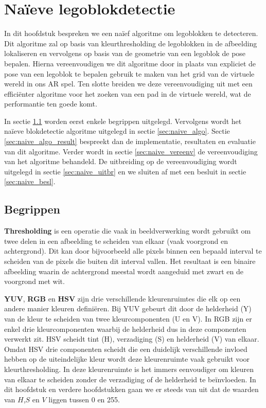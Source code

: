\chapter{Na\"ieve legoblokdetectie}
\label{hoofdstuk:2}
In dit hoofdstuk bespreken we een na\"ief algoritme om legoblokken te detecteren. Dit algoritme zal op basis van kleurthresholding de legoblokken in de afbeelding lokaliseren en vervolgens op basis van de geometrie van een legoblok de pose bepalen. Hierna vereenvoudigen we dit algoritme door in plaats van expliciet de pose van een legoblok te bepalen gebruik te maken van het grid van de virtuele wereld in ons AR spel. Ten slotte breiden we deze vereenvoudiging uit met een effici\"enter algoritme voor het zoeken van een pad in de virtuele wereld, wat de performantie ten goede komt.

In sectie \ref{sec:naive_begr} worden eerst enkele begrippen uitgelegd. Vervolgens wordt het na\"ieve blokdetectie algoritme uitgelegd in sectie \ref{sec:naive_algo}. Sectie \ref{sec:naive_algo_result} bespreekt dan de implementatie, resultaten en evaluatie van dit algoritme. Verder wordt in sectie \ref{sec:naive_vereenv} de vereenvoudiging van het algoritme behandeld. De uitbreiding op de vereenvoudiging wordt uitgelegd in sectie \ref{sec:naive_uitbr} en we sluiten af met een besluit in sectie \ref{sec:naive_besl}.

\section{Begrippen} \label{sec:naive_begr}

\textbf{Thresholding} is een operatie die vaak in beeldverwerking wordt gebruikt om twee delen in een afbeelding te scheiden van elkaar (vaak voorgrond en achtergrond). Dit kan door bijvoorbeeld alle pixels binnen een bepaald interval te scheiden van de pixels die buiten dit interval vallen. Het resultaat is een binaire afbeelding waarin de achtergrond meestal wordt aangeduid met zwart en de voorgrond met wit.

\textbf{YUV}, \textbf{RGB} en \textbf{HSV} zijn drie verschillende kleurenruimtes die elk op een andere manier kleuren defini\"eren. Bij YUV gebeurt dit door de helderheid (Y) van de kleur te scheiden van twee kleurcomponenten (U en V). In RGB zijn er enkel drie kleurcomponenten waarbij de helderheid dus in deze componenten verwerkt zit. HSV scheidt tint (H), verzadiging (S) en helderheid (V) van elkaar. Omdat HSV drie componenten scheidt die een duidelijk verschillende invloed hebben op de uiteindelijke kleur wordt deze kleurenruimte vaak gebruikt voor kleurthresholding. In deze kleurenruimte is het immers eenvoudiger om kleuren van elkaar te scheiden zonder de verzadiging of de helderheid te be\"invloeden. In dit hoofdstuk en verdere hoofdstukken gaan we er steeds van uit dat de waarden van $H$,$S$ en $V$ liggen tussen 0 en 255.

